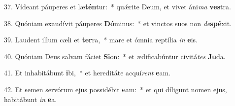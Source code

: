 37. Vídeant páuperes et læ\textbf{tén}tur:~*  quǽrite Deum, et vivet áni\textit{ma} \textbf{ves}tra.\

38. Quóniam exaudívit páuperes \textbf{Dó}minus:~*  et vinctos suos non \textit{de}\textbf{spé}xit.\

39. Laudent illum cæli et \textbf{ter}ra,~*  mare et ómnia reptília \textit{in} \textbf{e}is.\

40. Quóniam Deus salvam fáciet \textbf{Si}on:~*  et ædificabúntur civitá\textit{tes} \textbf{Ju}da.\

41. Et inhabitábunt \textbf{i}bi,~*  et hereditáte acquí\textit{rent} \textbf{e}am.\

42. Et semen servórum ejus possidébit \textbf{e}am:~*  et qui díligunt nomen ejus, habitábunt \textit{in} \textbf{e}a.\

